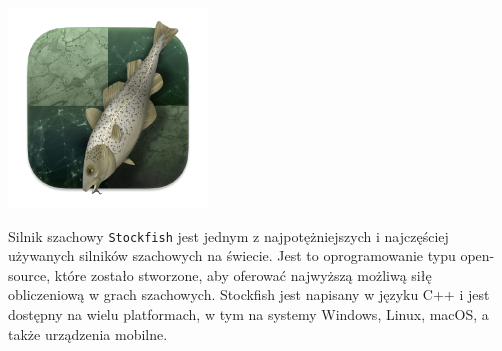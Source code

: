 \documentclass[12pt,a4paper]{article}
\begin{document}
\begin{minipage}[t]{0.2\textwidth} 
    \vspace{0pt} 
    \centering
    \includegraphics[width=\linewidth]{images/stockfish_logo.png} 
\end{minipage} 
\hfill 
\begin{minipage}[t]{0.7\textwidth} 
    \vspace{0pt} 
    \justifying 
    \noindent 
    Silnik szachowy \texttt{Stockfish} jest jednym z najpotężniejszych i najczęściej używanych silników szachowych na świecie. Jest to oprogramowanie typu open-source, które zostało stworzone, aby oferować najwyższą możliwą siłę obliczeniową w grach szachowych. Stockfish jest napisany w języku C++ i jest dostępny na wielu platformach, w tym na systemy Windows, Linux, macOS, a także urządzenia mobilne.
\end{minipage} 
\vspace{1cm}
\end{document}
